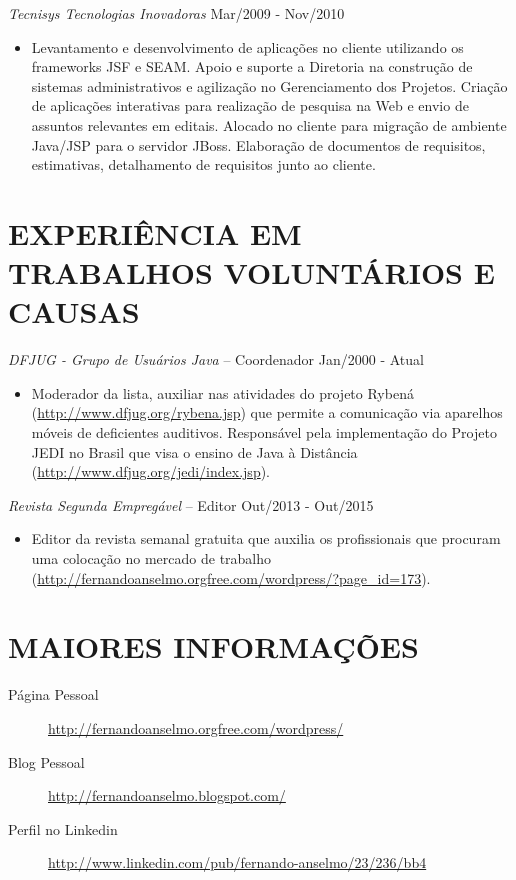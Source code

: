 \documentclass{res}
\begin{document}
\begin{resume}
		{\sl Tecnisys Tecnologias Inovadoras} \hfill   Mar/2009 - Nov/2010
		\begin{itemize}
			\item Levantamento e desenvolvimento de aplicações no cliente utilizando os frameworks JSF e SEAM. Apoio e suporte a Diretoria na construção de sistemas administrativos e agilização no Gerenciamento dos Projetos. Criação de aplicações interativas para realização de pesquisa na Web e envio de assuntos relevantes em editais. Alocado no cliente para migração de ambiente Java/JSP para o servidor JBoss. Elaboração de documentos de requisitos, estimativas, detalhamento de requisitos junto ao cliente.
		\end{itemize}
		
		\section{EXPERIÊNCIA EM TRABALHOS VOLUNTÁRIOS E CAUSAS}
		\vspace{8pt} 
		{\sl DFJUG - Grupo de Usuários Java} -- Coordenador \hfill Jan/2000 - Atual
		\begin{itemize}
			\item Moderador da lista, auxiliar nas atividades do projeto Rybená (\url{http://www.dfjug.org/rybena.jsp}) 
			que permite a comunicação via aparelhos móveis de deficientes auditivos. Responsável pela implementação 
			do Projeto JEDI no Brasil que visa o ensino de Java à Distância (\url{http://www.dfjug.org/jedi/index.jsp}).
		\end{itemize}
		
		{\sl Revista Segunda Empregável} -- Editor \hfill   Out/2013 - Out/2015
		\begin{itemize}
			\item Editor da revista semanal gratuita que auxilia os profissionais 
			que procuram uma colocação no mercado de trabalho (\url{http://fernandoanselmo.orgfree.com/wordpress/?page_id=173}).
		\end{itemize}
		
		\section{MAIORES INFORMAÇÕES}
		\vspace{18pt} 
		\begin{description}
			\item[Página Pessoal] \url{http://fernandoanselmo.orgfree.com/wordpress/}
			\item[Blog Pessoal] \url{http://fernandoanselmo.blogspot.com/}
			\item[Perfil no Linkedin] \url{http://www.linkedin.com/pub/fernando-anselmo/23/236/bb4}
		\end{description}
		
	\end{resume} 
\end{document}
